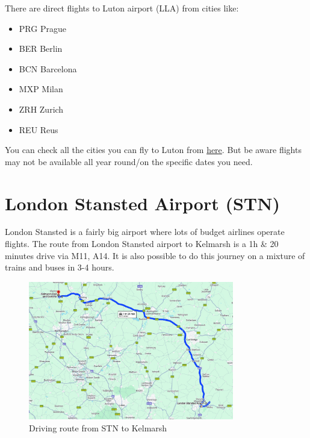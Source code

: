\documentclass[a4paper, 11pt]{article}
\begin{document}
There are direct flights to Luton airport (LLA) from cities like:
\begin{multicols}{2}
    \begin{itemize}
        \item PRG Prague
        \item BER Berlin
        \item BCN Barcelona
        \item MXP Milan
        \item ZRH Zurich
        \item REU Reus
    \end{itemize}
\end{multicols}

You can check all the cities you can fly to Luton from \href{https://www.london-luton.co.uk/destinations}{here}. But be aware flights may not be available all year round/on the specific dates you need.

\section{London Stansted Airport (STN)}
London Stansted is a fairly big airport where lots of budget airlines operate flights. The route from London Stansted airport to Kelmarsh is a 1h \& 20 minutes drive via M11, A14. It is also possible to do this journey on a mixture of trains and buses in 3-4 hours. 

\begin{figure}[H]
    \centering
    \includegraphics[width=0.8\textwidth]{assets/stn.png}
    \caption{Driving route from STN to Kelmarsh}
\end{figure}
\end{document}
